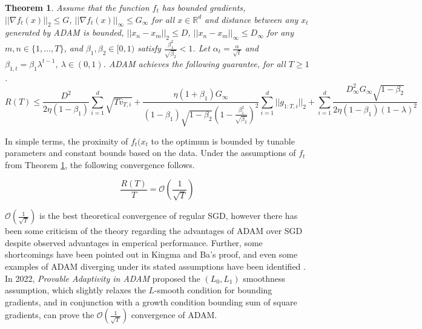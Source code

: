 \documentclass[letterpaper,11 pt]{article}
\newtheorem{theorem}{Theorem}
\newtheorem{corollary}{Corollary}
\begin{document}
\begin{theorem}\label{thm:adamregbound}
Assume that the function $f_t$ has bounded gradients, $|| \nabla f_{t}(x)||_{2} \leq G$, $|| \nabla f_{t}(x)||_{\infty} \leq G_{\infty}$ for all $x \in \mathbb{R}^{d}$ and distance between any $x_t$ generated by ADAM is bounded, $||x_{n} - x_{m}||_{2} \leq D$, $||x_{n} - x_{m}||_{\infty} \leq D_{\infty}$ for any $m,n \in \{1,...,T\}$, and $\beta_{1}, \beta_{2} \in [0,1)$ satisfy $\frac{\beta_{1}^{2}}{\sqrt{\beta_{2}}} < 1$. Let $\alpha_{t} = \frac{\alpha}{\sqrt{t}}$ and $\beta_{1,t} = \beta_{1}\lambda^{t-1}$, $\lambda \in (0,1)$. ADAM achieves the following guarantee, for all $T \geq 1$.
\[
R(T)\leq\frac{D^{2}}{2\eta(1-\beta_{1})}\sum_{i=1}^{d}\sqrt{T\hat{v}_{T,i}}+\frac{\eta(1+\beta_{1})G_{\infty}}{(1-\beta_{1})\sqrt{1-\beta_{2}}(1-\frac{\beta_{1}^{2}}{\sqrt{\beta_{2}}})^{2}}\sum_{i=1}^{d}||g_{1:T,i}||_{2}+\sum_{i=1}^{d}\frac{D_{\infty}^{2}G_{\infty}\sqrt{1-\beta_{2}}}{2\eta(1-\beta_{1})(1-\lambda)^{2}}
\]
\end{theorem}

In simple terms, the proximity of $f_{t}(x_{t}$ to the optimum is bounded by tunable parameters and constant bounds based on the data. Under the assumptions of $f_{t}$ from Theorem \ref{thm:adamregbound}, the following convergence follows.

\[
\frac{R(T)}{T} = \mathcal{O}\left(\frac{1}{\sqrt{T}}\right)
\]

$\mathcal{O}\left(\frac{1}{\sqrt{T}}\right)$ is the best theoretical convergence of regular SGD, however there has been some criticism of the theory regarding the advantages of ADAM over SGD despite observed advantages in emperical performance. Further, some shortcomings have been pointed out in Kingma and Ba's proof, and even some examples of ADAM diverging under its stated assumptions have been identified \cite{reddidivergence}.  In 2022, \textit{Provable Adaptivity in ADAM} \cite{wangprovable} proposed the $(L_{0},L_{1})$ smoothness assumption, which slightly relaxes the $L$-smooth condition for bounding gradients, and in conjunction with a growth condition bounding sum of square gradients, can prove the $\mathcal{O}\left(\frac{1}{\sqrt{T}}\right)$ convergence of ADAM.
%
\end{document}
